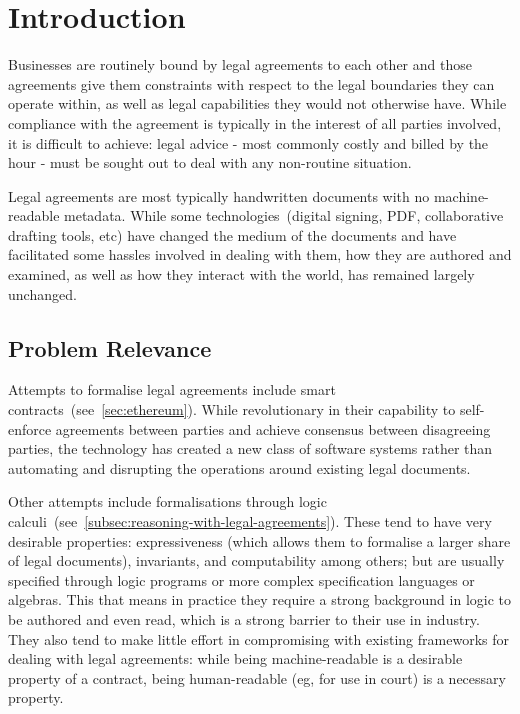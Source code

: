 \chapter{Introduction}\label{ch:introduction}

Businesses are routinely bound by legal agreements to each other and those agreements give them constraints with respect to the legal boundaries they can operate within, as well as legal capabilities they would not otherwise have.
While compliance with the agreement is typically in the interest of all parties involved, it is
difficult to achieve: legal advice - most commonly costly and billed by the hour - must be sought
out to deal with any non-routine situation.

Legal agreements are most typically handwritten documents with no machine-readable metadata.
While some technologies~(digital signing, PDF, collaborative drafting tools, etc) have changed the medium of the documents and have facilitated some hassles involved in dealing with them, how they are authored and examined, as well as how they interact with the world, has remained largely unchanged.

\section*{Problem Relevance}\label{sec:problem-relevance}

Attempts to formalise legal agreements include smart contracts~(see~\autoref{sec:ethereum}).
While revolutionary in their capability to self-enforce agreements between parties and achieve consensus between disagreeing parties, the technology has created a new class of software systems rather than automating and disrupting the operations around existing legal documents.

Other attempts include formalisations through logic calculi~(see~\autoref{subsec:reasoning-with-legal-agreements}).
These tend to have very desirable properties: expressiveness (which allows them to formalise a larger share of legal documents), invariants, and computability among others;
but are usually specified through logic programs or more complex specification languages or algebras.
This that means in practice they require a strong background in logic to be authored and even read, which is a strong barrier to their use in industry.
They also tend to make little effort in compromising with existing frameworks for dealing with legal agreements: while being machine-readable is a desirable property of a contract, being human-readable (eg, for use in court) is a necessary property.

